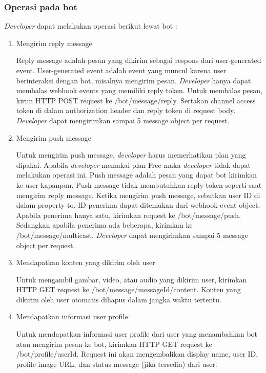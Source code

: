 \subsubsection{Operasi pada bot}
\textit{Developer} dapat melakukan operasi berikut lewat bot :
\begin{enumerate}
\item Mengirim reply message

Reply message adalah pesan yang dikirim sebagai respons dari user-generated event. User-generated event adalah event yang muncul karena user berinteraksi dengan bot, misalnya mengirim pesan. \textit{Developer} hanya dapat membalas webhook events yang memiliki reply token.
Untuk membalas pesan, kirim HTTP POST request ke /bot/message/reply. Sertakan channel access token di dalam authorization header dan reply token di request body. \textit{Developer} dapat mengirimkan sampai 5 message object per request.

\item Mengirim push message

Untuk mengirim push message, \textit{developer} harus memerhatikan plan yang dipakai. Apabila \textit{developer} memakai plan Free maka \textit{developer} tidak dapat melakukan operasi ini. Push message adalah pesan yang dapat bot kirimkan ke user kapanpun. Push message tidak membutuhkan reply token seperti saat mengirim reply message. Ketika mengirim push message, sebutkan user ID di dalam property to. ID penerima dapat ditemukan dari webhook event object. Apabila penerima hanya satu, kirimkan request ke /bot/message/push. Sedangkan apabila penerima ada beberapa, kirimkan ke /bot/message/multicast. \textit{Developer} dapat mengirimkan sampai 5 message object per request.

\item Mendapatkan konten yang dikirim oleh user

Untuk mengambil gambar, video, atau audio yang dikirim user, kirimkan HTTP GET request ke /bot/message/{messageId}/content. Konten yang dikirim oleh user otomatis dihapus dalam jangka waktu tertentu.

\item Mendapatkan informasi user profile

Untuk mendapatkan informasi user profile dari user yang menambahkan bot atau mengirim pesan ke bot, kirimkan HTTP GET request ke /bot/profile/{userId}. Request ini akan mengembalikan display name, user ID, profile image URL, dan status message (jika tersedia) dari user.
\end{enumerate}

